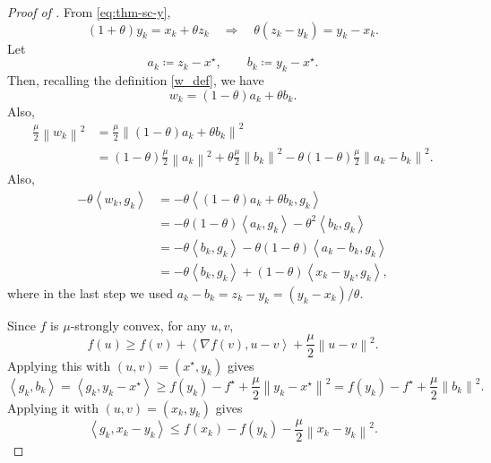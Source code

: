 \documentclass[10pt]{article}
\newcommand{\ip}[2]{\left\langle #1,#2\right\rangle}
\newcommand{\norm}[1]{\left\|#1\right\|}
\begin{document}
\begin{proof}[Proof of ]
From \eqref{eq:thm-sc-y},
\[
(1+\theta)y_k = x_k+\theta z_k
\quad\Longrightarrow\quad
\theta(z_k-y_k)=y_k-x_k.
\]
Let
\[
a_k\coloneqq z_k-x^\star,\qquad b_k\coloneqq y_k-x^\star.
\]
Then, recalling the definition \eqref{w_def}, we have
\[
w_k=(1-\theta)a_k+\theta b_k.
\]
Also,
\begin{align}
\frac{\mu}{2}\norm{w_k}^2
&=
\frac{\mu}{2}\norm{(1-\theta)a_k+\theta b_k}^2 \\
&=
(1-\theta)\frac{\mu}{2}\norm{a_k}^2
+\theta\frac{\mu}{2}\norm{b_k}^2
-\theta(1-\theta)\frac{\mu}{2}\norm{a_k-b_k}^2.
\label{eq:w-square}
\end{align}
Also,
\begin{align}
-\theta\ip{w_k}{g_k}
&= -\theta\ip{(1-\theta)a_k+\theta b_k}{g_k} \\
&= -\theta(1-\theta)\ip{a_k}{g_k}-\theta^2\ip{b_k}{g_k} \\
&= -\theta\ip{b_k}{g_k} - \theta(1-\theta)\ip{a_k-b_k}{g_k} \\
&= -\theta\ip{b_k}{g_k} + (1-\theta)\ip{x_k-y_k}{g_k},
\label{eq:w-inner}
\end{align}
where in the last step we used $a_k-b_k=z_k-y_k=(y_k-x_k)/\theta$.


Since $f$ is $\mu$-strongly convex, for any $u,v$,
\[
f(u)\ge f(v)+\ip{\nabla f(v)}{u-v}+\frac{\mu}{2}\norm{u-v}^2.
\]
Applying this with $(u,v)=(x^\star,y_k)$ gives
\begin{equation}
\ip{g_k}{b_k}=\ip{g_k}{y_k-x^\star}
\ge f(y_k)-f^\star + \frac{\mu}{2}\norm{y_k-x^\star}^2
= f(y_k)-f^\star + \frac{\mu}{2}\norm{b_k}^2.
\label{eq:sc-1}
\end{equation}
Applying it with $(u,v)=(x_k,y_k)$ gives
\begin{equation}
\ip{g_k}{x_k-y_k}
\le f(x_k)-f(y_k)-\frac{\mu}{2}\norm{x_k-y_k}^2.
\label{eq:sc-2}
\end{equation}



\end{proof}
\end{document}
